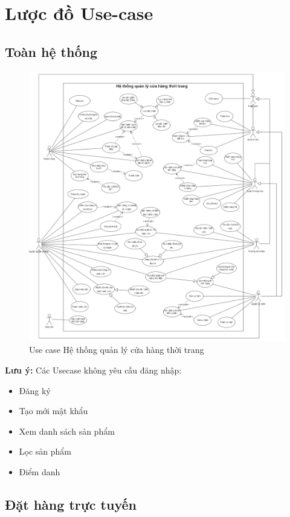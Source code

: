 \section{Lược đồ Use-case}
\subsection{Toàn hệ thống}
\begin{figure}[!htp]
    \centering    \includegraphics[width=16.5cm]{img/UseCase/UseCase-full.drawio.png}
    \newline
    \caption{Use case Hệ thống quản lý cửa hàng thời trang}
\end{figure}
\textbf{Lưu ý:} Các Usecase không yêu cầu đăng nhập:
\begin{itemize}
\item Đăng ký
\item Tạo mới mật khẩu
\item Xem danh sách sản phẩm
\item Lọc sản phẩm
\item Điểm danh
\end{itemize}
\newpage


\subsection{Đặt hàng trực tuyến}

